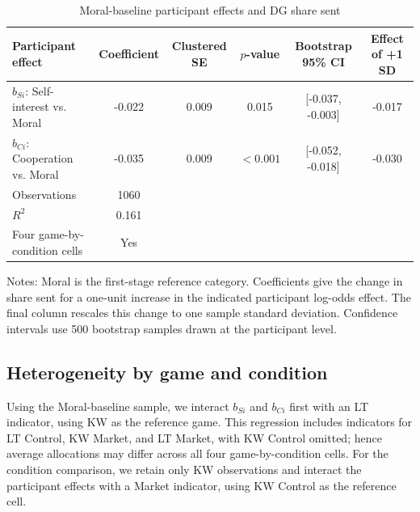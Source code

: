 \documentclass{article}
\begin{document}
\begin{table}[H]
\centering
\caption{Moral-baseline participant effects and DG share sent}
\label{tab:hp_weights_moral_baseline}
\begin{tabular}{lccccc}
\toprule
Participant effect & Coefficient & Clustered SE & $p$-value & Bootstrap 95\% CI & Effect of +1 SD \\
\midrule
$b_{Si}$: Self-interest vs. Moral & -0.022 & 0.009 & 0.015 & [-0.037, -0.003] & -0.017 \\
$b_{Ci}$: Cooperation vs. Moral & -0.035 & 0.009 & $<0.001$ & [-0.052, -0.018] & -0.030 \\
\midrule
Observations & 1060 & & & & \\
$R^2$ & 0.161 & & & & \\
Four game-by-condition cells & Yes & & & & \\
\bottomrule
\end{tabular}
\begin{flushleft}
\footnotesize Notes: Moral is the first-stage reference category. Coefficients give the change in share sent for a one-unit increase in the indicated participant log-odds effect. The final column rescales this change to one sample standard deviation. Confidence intervals use 500 bootstrap samples drawn at the participant level.
\end{flushleft}
\end{table}



\subsection{Heterogeneity by game and condition}

Using the Moral-baseline sample, we interact $b_{Si}$ and $b_{Ci}$ first with an LT indicator, using KW as the reference game. This regression includes indicators for LT Control, KW Market, and LT Market, with KW Control omitted; hence average allocations may differ across all four game-by-condition cells. For the condition comparison, we retain only KW observations and interact the participant effects with a Market indicator, using KW Control as the reference cell.
\end{document}

